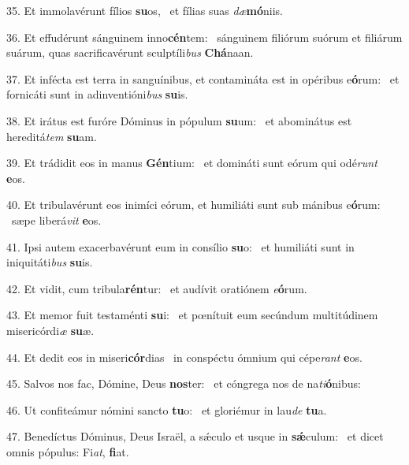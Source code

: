 35. Et immolavérunt fílios \textbf{su}os, \ast\  et fílias suas \textit{dæ}\textbf{mó}niis.\

36. Et effudérunt sánguinem inno\textbf{cén}tem: \ast\  sánguinem filiórum suórum et filiárum suárum, quas sacrificavérunt sculptíli\textit{bus} \textbf{Chá}naan.\

37. Et infécta est terra in sanguínibus, et contamináta est in opéribus e\textbf{ó}rum: \ast\  et fornicáti sunt in adinventióni\textit{bus} \textbf{su}is.\

38. Et irátus est furóre Dóminus in pópulum \textbf{su}um: \ast\  et abominátus est hereditá\textit{tem} \textbf{su}am.\

39. Et trádidit eos in manus \textbf{Gén}tium: \ast\  et domináti sunt eórum qui odé\textit{runt} \textbf{e}os.\

40. Et tribulavérunt eos inimíci eórum, et humiliáti sunt sub mánibus e\textbf{ó}rum: \ast\  sæpe liberá\textit{vit} \textbf{e}os.\

41. Ipsi autem exacerbavérunt eum in consílio \textbf{su}o: \ast\  et humiliáti sunt in iniquitáti\textit{bus} \textbf{su}is.\

42. Et vidit, cum tribula\textbf{rén}tur: \ast\  et audívit oratiónem \textit{e}\textbf{ó}rum.\

43. Et memor fuit testaménti \textbf{su}i: \ast\  et pœnítuit eum secúndum multitúdinem misericórdi\textit{æ} \textbf{su}æ.\

44. Et dedit eos in miseri\textbf{cór}dias \ast\  in conspéctu ómnium qui cépe\textit{rant} \textbf{e}os.\

45. Salvos nos fac, Dómine, Deus \textbf{nos}ter: \ast\  et cóngrega nos de na\textit{ti}\textbf{ó}nibus:\

46. Ut confiteámur nómini sancto \textbf{tu}o: \ast\  et gloriémur in lau\textit{de} \textbf{tu}a.\

47. Benedíctus Dóminus, Deus Israël, a sǽculo et usque in \textbf{sǽ}culum: \ast\  et dicet omnis pópulus: Fi\textit{at}, \textbf{fi}at.\

